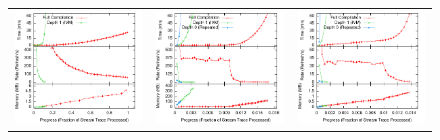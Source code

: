 \begin{figure}
\begin{center}
\begin{minipage}{\textwidth}
\begin{center}
\begin{tabular}{ccc}
\includegraphics[width=\figurewidth]{../graphs/graphs/unified_serverload.pdf}&
\includegraphics[width=\figurewidth]{../graphs/graphs/unified_pricespread.pdf}&
\includegraphics[width=\figurewidth]{../graphs/graphs/unified_missedtrades.pdf}\\

\end{tabular}
\end{center}
\end{minipage}
\end{center}
\end{figure}
